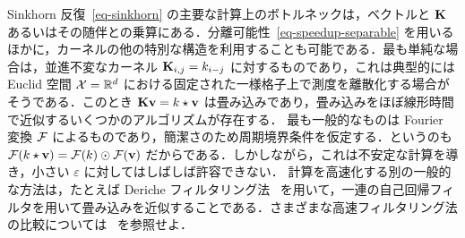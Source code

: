 \begin{rem}[近似された畳み込み]\label{rem-convol-sinkh}
Sinkhorn 反復~\eqref{eq-sinkhorn} の主要な計算上のボトルネックは，ベクトルと $\mathrm{\textbf{K}}$ あるいはその随伴との乗算にある．分離可能性~\eqref{eq-speedup-separable} を用いるほかに，カーネルの他の特別な構造を利用することも可能である．最も単純な場合は，並進不変なカーネル $\mathrm{\textbf{K}}_{i,j} = k_{i-j}$ に対するものであり，これは典型的には Euclid 空間 $\mathcal{X}=\mathbb{R}^d$ における固定された一様格子上で測度を離散化する場合がそうである．このとき $\mathrm{\textbf{K}} \mathrm{\textbf{v}} = k \star \mathrm{\textbf{v}}$ は畳み込みであり，畳み込みをほぼ線形時間で近似するいくつかのアルゴリズムが存在する．
%
最も一般的なものは Fourier 変換 $\mathcal{F}$ によるものであり，簡潔さのため周期境界条件を仮定する．というのも $\mathcal{F}(k \star \mathrm{\textbf{v}})=\mathcal{F}(k) \odot \mathcal{F}(\mathrm{\textbf{v}})$ だからである．しかしながら，これは不安定な計算を導き，小さい $\varepsilon$ に対してはしばしば許容できない．
%
計算を高速化する別の一般的な方法は，たとえば Deriche フィルタリング法~\citet{deriche1993recursively} を用いて，一連の自己回帰フィルタを用いて畳み込みを近似することである．さまざまな高速フィルタリング法の比較については~\citep{getreuer2013survey} を参照せよ．
\end{rem}

